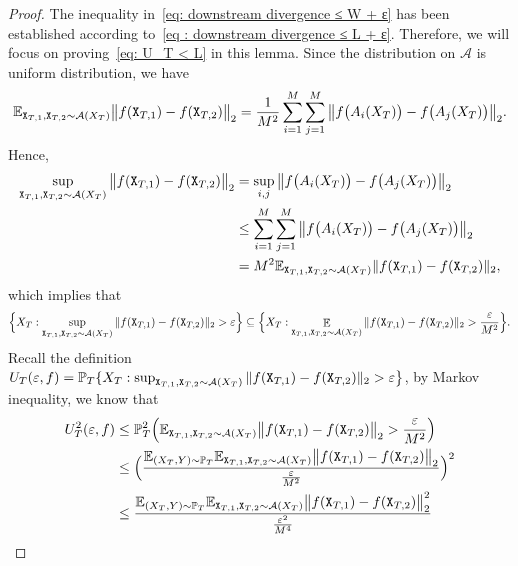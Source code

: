 \begin{proof}
The inequality in~\eqref{eq: downstream divergence ≤ W + ɛ} has been established according to~\eqref{eq : downstream divergence ≤ L + ɛ}. Therefore, we will focus on proving~\eqref{eq: U_T < L} in this lemma. Since the distribution on $\mathcal{A}$ is uniform distribution, we have
\begin{align*}
    \mathbb{E}_{\mathtt{X}_{T,1}, \mathtt{X}_{T,2} \sim \mathcal{A}(X_T)}\big\Vert f(\mathtt{X}_{T,1}) - f(\mathtt{X}_{T,2})\big\Vert_2 = \frac{1}{M^2}\sum_{i = 1}^M\sum_{j = 1}^M\big\Vert f\big(A_i(X_T)\big) - f\big(A_j(X_T)\big)\big\Vert_2.
\end{align*}
Hence,
\begin{align*}
    \sup_{\mathtt{X}_{T,1}, \mathtt{X}_{T,2} \sim \mathcal{A}(X_T)}\big\Vert f(\mathtt{X}_{T,1}) - f(\mathtt{X}_{T,2})\big\Vert_2 &= \sup_{i, j}\big\Vert f\big(A_i(X_T)\big) - f\big(A_j(X_T)\big)\big\Vert_2 \\
    &\leq \sum_{i = 1}^M\sum_{j = 1}^M\big\Vert f\big(A_i(X_T)\big) - f\big(A_j(X_T)\big)\big\Vert_2 \\
    &= M^2\mathbb{E}_{\mathtt{X}_{T,1}, \mathtt{X}_{T,2} \sim \mathcal{A}(X_T)}\Vert{f(\mathtt{X}_{T,1}) - f(\mathtt{X}_{T,2})}\Vert_2,
\end{align*}
which implies that
\begin{align*}
    \Big\{X_T: \sup_{\mathtt{X}_{T,1}, \mathtt{X}_{T,2} \sim \mathcal{A}(X_T)}\Vert{f(\mathtt{X}_{T,1}) - f(\mathtt{X}_{T,2})}\Vert_2 > \varepsilon\Big\} \subseteq \Big\{X_T:\mathop{\mathbb{E}}_{\mathtt{X}_{T,1}, \mathtt{X}_{T,2} \sim \mathcal{A}(X_T)}\Vert{f(\mathtt{X}_{T,1}) - f(\mathtt{X}_{T,2})}\Vert_2 > \frac{\varepsilon}{M^2}\Big\}.
\end{align*}
Recall the definition $U_T(\varepsilon, f) = \mathbb{P}_T\{X_T: \sup_{\mathtt{X}_{T,1}, \mathtt{X}_{T,2} \sim \mathcal{A}(X_T)}\Vert{f(\mathtt{X}_{T,1}) - f(\mathtt{X}_{T,2})}\Vert_2 > \varepsilon\big\}$, by Markov inequality, we know that
\begin{align}
\label{eq : U ≤ alignment}
U^2_T(\eps, f) &\leq \P^2_T\Big(\E_{\mathtt{X}_{T,1}, \mathtt{X}_{T,2} \sim \mathcal{A}(X_T)}\big\Vert f(\mathtt{X}_{T,1}) - f(\mathtt{X}_{T,2})\big\Vert_2 > \frac{\eps}{M^2}\Big) \nonumber \\
&\leq \Big(\frac{\E_{(X_T, Y) \sim \P_T}\E_{\mathtt{X}_{T,1}, \mathtt{X}_{T,2} \sim \mathcal{A}(X_T)}\big\Vert f(\mathtt{X}_{T,1}) - f(\mathtt{X}_{T,2})\big\Vert_2}{\frac{\eps}{M^2}}\Big)^2 \nonumber \\
&\leq \frac{\E_{(X_T, Y) \sim \P_T}\E_{\mathtt{X}_{T,1}, \mathtt{X}_{T,2} \sim \mathcal{A}(X_T)}\big\Vert f(\mathtt{X}_{T,1}) - f(\mathtt{X}_{T,2})\big\Vert^2_2}{\frac{\eps^2}{M^4}} \nonumber \\

\end{align}
\end{proof}
